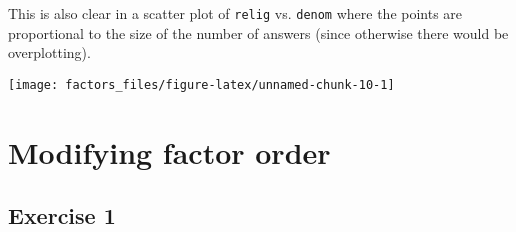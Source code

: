 \documentclass[]{book}
\newenvironment{Shaded}{\begin{snugshade}}{\end{snugshade}}
\newcommand{\CommentTok}[1]{\textcolor[rgb]{0.56,0.35,0.01}{\textit{#1}}}
\newcommand{\DataTypeTok}[1]{\textcolor[rgb]{0.13,0.29,0.53}{#1}}
\newcommand{\DecValTok}[1]{\textcolor[rgb]{0.00,0.00,0.81}{#1}}
\newcommand{\KeywordTok}[1]{\textcolor[rgb]{0.13,0.29,0.53}{\textbf{#1}}}
\newcommand{\NormalTok}[1]{#1}
\newcommand{\OperatorTok}[1]{\textcolor[rgb]{0.81,0.36,0.00}{\textbf{#1}}}
\newcommand{\StringTok}[1]{\textcolor[rgb]{0.31,0.60,0.02}{#1}}
\theoremstyle{plain}
\theoremstyle{remark}
\theoremstyle{definition}
\theoremstyle{definition}
\theoremstyle{definition}
\theoremstyle{remark}
\begin{document}
\begin{Shaded}
\end{Shaded}

This is also clear in a scatter plot of \texttt{relig} vs.
\texttt{denom} where the points are proportional to the size of the
number of answers (since otherwise there would be overplotting).

\begin{Shaded}
\end{Shaded}

\begin{center}\texttt{[image: factors\_files/figure-latex/unnamed-chunk-10-1]} \end{center}

\hypertarget{modifying-factor-order}{%
\section{Modifying factor order}\label{modifying-factor-order}}

\hypertarget{exercise-1-44}{%
\subsection{Exercise 1}\label{exercise-1-44}}
\end{document}
